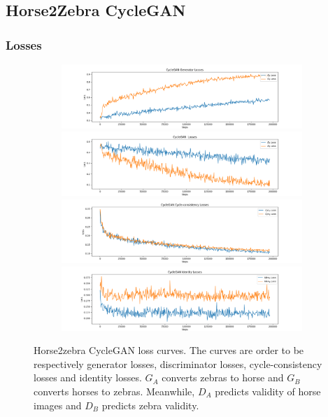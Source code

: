 \documentclass[11pt, fleqn, titlepage]{article}
\newcommand{\1}[1]{\mathds{1}\left[#1\right]}
\begin{document}
\newpage
\subsection{Horse2Zebra CycleGAN}\label{horse2zebra_cyclegan}


\subsubsection{Losses}
\begin{figure}[H]
	\centering
	\begin{subfigure}[b]{0.8\textwidth}
		\centering
		\includegraphics[width=\linewidth]{imgs/horse2zebra_generator_losses}
		\label{fig:horse2zebra_generator_loss}
		\hfill
		\includegraphics[width=\linewidth]{imgs/horse2zebra_discriminator_losses}
		\label{fig:horse2zebra_discriminator_loss}
		\hfill
		\includegraphics[width=\linewidth]{imgs/horse2zebra_cycle_losses}
		\label{fig:horse2zebra_cycle_loss}
		\hfill
		\includegraphics[width=\linewidth]{imgs/horse2zebra_identity_losses}
		\label{fig:horse2zebra_identity_loss}
	\end{subfigure}
	\caption{Horse2zebra CycleGAN loss curves. The curves are order to be respectively generator losses, discriminator losses, cycle-consistency losses and identity losses. $G_A$ converts zebras to horse and $G_B$ converts horses to zebras. Meanwhile, $D_A$ predicts validity of horse images and $D_B$ predicts zebra validity.}
	\label{fig:horse2zebra_losses}
\end{figure}
\end{document}
